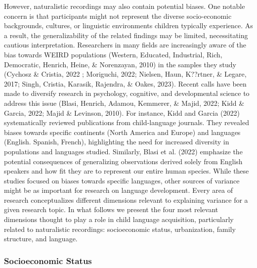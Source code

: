 \documentclass[
  man,floatsintext]{apa6}
\begin{document}
However, naturalistic recordings may also contain potential biases. One notable concern is that participants might not represent the diverse socio-economic backgrounds, cultures, or linguistic environments children typically experience. As a result, the generalizability of the related findings may be limited, necessitating cautious interpretation. Researchers in many fields are increasingly aware of the bias towards WEIRD populations (Western, Educated, Industrial, Rich, Democratic, Henrich, Heine, \& Norenzayan, 2010) in the samples they study (Cychosz \& Cristia, 2022 ; Moriguchi, 2022; Nielsen, Haun, K??rtner, \& Legare, 2017; Singh, Cristia, Karasik, Rajendra, \& Oakes, 2023). Recent calls have been made to diversify research in psychology, cognitive, and developmental science to address this issue (Blasi, Henrich, Adamou, Kemmerer, \& Majid, 2022; Kidd \& Garcia, 2022; Majid \& Levinson, 2010). For instance, Kidd and Garcia (2022) systematically reviewed publications from child-language journals. They revealed biases towards specific continents (North America and Europe) and languages (English. Spanish, French), highlighting the need for increased diversity in populations and languages studied. Similarly, Blasi et al. (2022) emphasize the potential consequences of generalizing observations derived solely from English speakers and how fit they are to represent our entire human species. While these studies focused on biases towards specific languages, other sources of variance might be as important for research on language development.
Every area of research conceptualizes different dimensions relevant to explaining variance for a given research topic. In what follows we present the four most relevant dimensions thought to play a role in child language acquisition, particularly related to naturalistic recordings: socioeconomic status, urbanization, family structure, and language.

\hypertarget{socioeconomic-status}{%
\subsubsection{Socioeconomic Status}\label{socioeconomic-status}}
\end{document}
